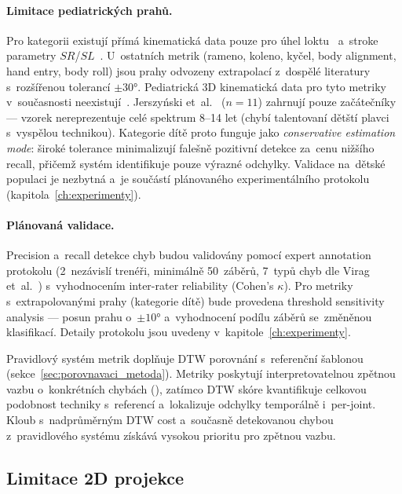 \paragraph{Limitace pediatrických prahů.} Pro kategorii  existují přímá kinematická data pouze pro úhel loktu~\cite{jerszynski2013} a~stroke parametry $SR$/$SL$~\cite{barbosa2019,santos2023}. U~ostatních metrik (rameno, koleno, kyčel, body alignment, hand entry, body roll) jsou prahy odvozeny extrapolací z~dospělé literatury s~rozšířenou tolerancí $\pm 30°$. Pediatrická 3D kinematická data pro tyto metriky v~současnosti neexistují~\cite{psycharakis2010}. Jerszyński et~al.~\cite{jerszynski2013} ($n=11$) zahrnují pouze začátečníky --- vzorek nereprezentuje celé spektrum 8--14 let (chybí talentovaní dětští plavci s~vyspělou technikou). Kategorie dítě proto funguje jako \textit{conservative estimation mode}: široké tolerance minimalizují falešně pozitivní detekce za~cenu nižšího recall, přičemž systém identifikuje pouze výrazné odchylky. Validace na~dětské populaci je nezbytná a~je součástí plánovaného experimentálního protokolu (kapitola~\ref{ch:experimenty}).

\paragraph{Plánovaná validace.} Precision a~recall detekce chyb budou validovány pomocí expert annotation protokolu (2~nezávislí trenéři, minimálně 50~záběrů, 7~typů chyb dle Virag et~al.~\cite{virag2014}) s~vyhodnocením inter-rater reliability (Cohen's $\kappa$). Pro metriky s~extrapolovanými prahy (kategorie dítě) bude provedena threshold sensitivity analysis --- posun prahu o~$\pm 10°$ a~vyhodnocení podílu záběrů se~změněnou klasifikací. Detaily protokolu jsou uvedeny v~kapitole~\ref{ch:experimenty}.

Pravidlový systém metrik doplňuje DTW porovnání s~referenční šablonou (sekce~\ref{sec:porovnavaci_metoda}). Metriky poskytují interpretovatelnou zpětnou vazbu o~konkrétních chybách (), zatímco DTW skóre kvantifikuje celkovou podobnost techniky s~referencí a~lokalizuje odchylky temporálně i~per-joint. Kloub s~nadprůměrným DTW cost a~současně detekovanou chybou z~pravidlového systému získává vysokou prioritu pro zpětnou vazbu.

\subsection{Limitace 2D projekce}
\label{subsec:limitace_2d}

